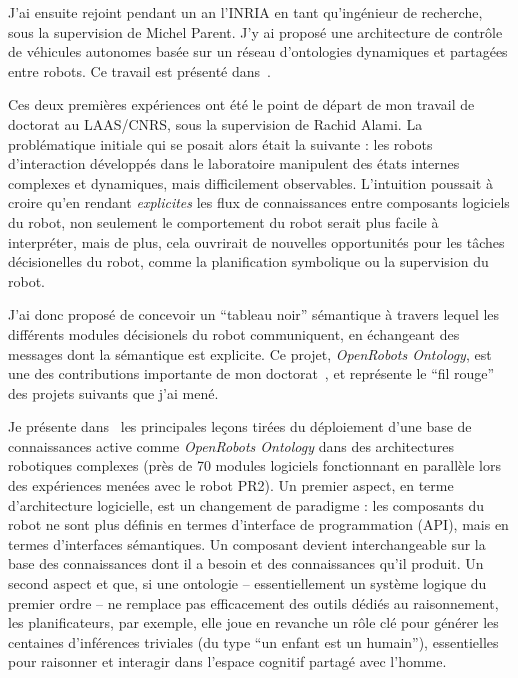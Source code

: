\documentclass[a4paper]{article}
\begin{document}
J'ai ensuite rejoint pendant un an l'INRIA en tant qu'ingénieur de recherche,
sous la supervision de Michel Parent.  J'y ai proposé une architecture de
contrôle de véhicules autonomes basée sur un réseau d'ontologies dynamiques et
partagées entre robots. Ce travail est présenté
dans~\cite{mehani2007networking}.

Ces deux premières expériences ont été le point de départ de mon travail de
doctorat au LAAS/CNRS, sous la supervision de Rachid Alami. La problématique
initiale qui se posait alors était la suivante : les robots d'interaction
développés dans le laboratoire manipulent des états internes complexes et
dynamiques, mais difficilement observables. L'intuition poussait à croire qu'en
rendant \emph{explicites} les flux de connaissances entre composants logiciels
du robot, non seulement le comportement du robot serait plus facile à
interpréter, mais de plus, cela ouvrirait de nouvelles opportunités pour les
tâches décisionelles du robot, comme la planification symbolique ou la
supervision du robot.

J'ai donc proposé de concevoir un ``tableau noir'' sémantique à travers lequel
les différents modules décisionels du robot communiquent, en échangeant des
messages dont la sémantique est explicite. Ce projet, \emph{OpenRobots
Ontology}, est une des contributions importante de mon
doctorat~\cite{Lemaignan2010}, et représente le ``fil rouge'' des projets
suivants que j'ai mené.

Je présente dans~\cite{lemaignan2013explicit} les principales leçons tirées du
déploiement d'une base de connaissances active comme \emph{OpenRobots Ontology}
dans des architectures robotiques complexes (près de 70 modules logiciels
fonctionnant en parallèle lors des expériences menées avec le robot PR2). Un
premier aspect, en terme d'architecture logicielle, est un changement de
paradigme : les composants du robot ne sont plus définis en termes d'interface de
programmation (API), mais en termes d'interfaces sémantiques. Un composant
devient interchangeable sur la base des connaissances dont il a besoin et des
connaissances qu'il produit. Un second aspect et que, si une ontologie --
essentiellement un système logique du premier ordre -- ne remplace pas
efficacement des outils dédiés au raisonnement, les planificateurs, par exemple,
elle joue en revanche un rôle clé pour générer les centaines
d'inférences triviales (du type ``un enfant est un humain''), essentielles pour
raisonner et interagir dans l'espace cognitif partagé avec l'homme.
\end{document}
